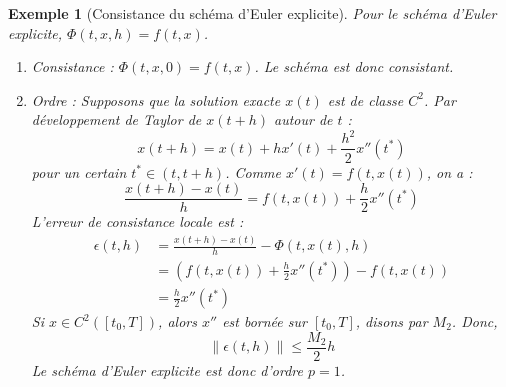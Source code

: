 \documentclass{article}
\newtheorem{example}{Exemple}
\begin{document}
\begin{example}[Consistance du schéma d'Euler explicite]
Pour le schéma d'Euler explicite, $\Phi(t, x, h) = f(t, x)$.
\begin{enumerate}
    \item Consistance : $\Phi(t, x, 0) = f(t, x)$. Le schéma est donc consistant.
    \item Ordre : Supposons que la solution exacte $x(t)$ est de classe $C^2$. Par développement de Taylor de $x(t+h)$ autour de $t$ :
    \begin{equation*}
    x(t+h) = x(t) + h x'(t) + \frac{h^2}{2} x''(t^*)
    \end{equation*}
    pour un certain $t^* \in (t, t+h)$. Comme $x'(t) = f(t, x(t))$, on a :
    \begin{equation*}
    \frac{x(t+h) - x(t)}{h} = f(t, x(t)) + \frac{h}{2} x''(t^*)
    \end{equation*}
    L'erreur de consistance locale est :
    \begin{align*} \epsilon(t, h) &= \frac{x(t+h) - x(t)}{h} - \Phi(t, x(t), h) \\ &= \left( f(t, x(t)) + \frac{h}{2} x''(t^*) \right) - f(t, x(t)) \\ &= \frac{h}{2} x''(t^*) \end{align*}
    Si $x \in C^2([t_0, T])$, alors $x''$ est bornée sur $[t_0, T]$, disons par $M_2$. Donc,
    \begin{equation*}
    \|\epsilon(t, h)\| \le \frac{M_2}{2} h
    \end{equation*}
    Le schéma d'Euler explicite est donc d'ordre $p=1$.
\end{enumerate}
\end{example}
\end{document}
